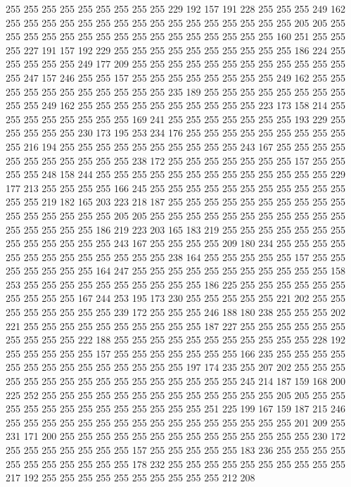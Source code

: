 255 255 255 255 255 255 255 255 255 229 192 157 191 228 255 255 255 249 162 255
255 255 255 255 255 255 255 255 255 255 255 255 255 255 255 205 205 255 255 255
255 255 255 255 255 255 255 255 255 255 255 255 255 160 251 255 255 255 227 191
157 192 229 255 255 255 255 255 255 255 255 255 255 186 224 255 255 255 255 255
249 177 209 255 255 255 255 255 255 255 255 255 255 255 255 255 247 157 246 255
255 157 255 255 255 255 255 255 255 255 249 162 255 255 255 255 255 255 255 255
255 255 255 235 189 255 255 255 255 255 255 255 255 255 255 249 162 255 255 255
255 255 255 255 255 255 255 223 173 158 214 255 255 255 255 255 255 255 255 169
241 255 255 255 255 255 255 255 193 229 255 255 255 255 255 230 173 195 253 234
176 255 255 255 255 255 255 255 255 255 255 216 194 255 255 255 255 255 255 255
255 255 255 243 167 255 255 255 255 255 255 255 255 255 255 255 238 172 255 255
255 255 255 255 255 157 255 255 255 255 248 158 244 255 255 255 255 255 255 255
255 255 255 255 255 255 229 177 213 255 255 255 255 166 245 255 255 255 255 255
255 255 255 255 255 255 255 255 219 182 165 203 223 218 187 255 255 255 255 255
255 255 255 255 255 255 255 255 255 255 255 205 205 255 255 255 255 255 255 255
255 255 255 255 255 255 255 255 255 186 219 223 203 165 183 219 255 255 255 255
255 255 255 255 255 255 255 255 255 243 167 255 255 255 255 209 180 234 255 255
255 255 255 255 255 255 255 255 255 255 255 238 164 255 255 255 255 255 157 255
255 255 255 255 255 255 164 247 255 255 255 255 255 255 255 255 255 255 255 158
253 255 255 255 255 255 255 255 255 255 255 186 225 255 255 255 255 255 255 255
255 255 255 167 244 253 195 173 230 255 255 255 255 255 221 202 255 255 255 255
255 255 255 255 239 172 255 255 255 246 188 180 238 255 255 255 202 221 255 255
255 255 255 255 255 255 255 255 187 227 255 255 255 255 255 255 255 255 255 255
222 188 255 255 255 255 255 255 255 255 255 255 255 228 192 255 255 255 255 255
157 255 255 255 255 255 255 255 166 235 255 255 255 255 255 255 255 255 255 255
255 255 255 255 197 174 235 255 207 202 255 255 255 255 255 255 255 255 255 255
255 255 255 255 255 255 245 214 187 159 168 200 225 252 255 255 255 255 255 255
255 255 255 255 255 255 255 205 205 255 255 255 255 255 255 255 255 255 255 255
255 255 251 225 199 167 159 187 215 246 255 255 255 255 255 255 255 255 255 255
255 255 255 255 255 255 201 209 255 231 171 200 255 255 255 255 255 255 255 255
255 255 255 255 255 255 230 172 255 255 255 255 255 255 255 157 255 255 255 255
255 183 236 255 255 255 255 255 255 255 255 255 255 255 178 232 255 255 255 255
255 255 255 255 255 255 217 192 255 255 255 255 255 255 255 255 255 255 212 208
